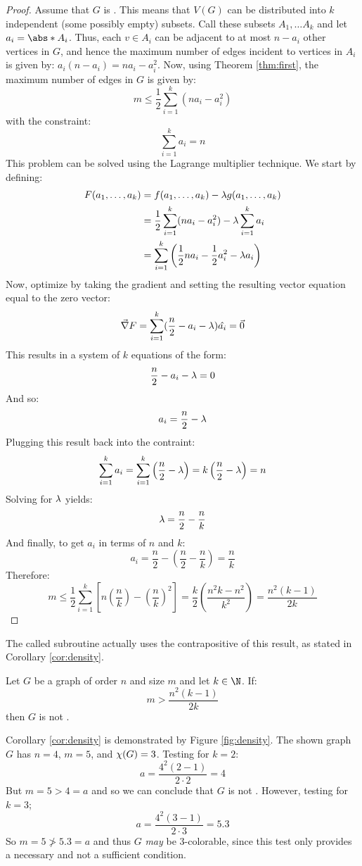 \begin{proof}
  Assume that \(G\) is .  This means that \(V(G)\) can be distributed into \(k\) independent (some
  possibly empty) subsets.  Call these subsets \(A_1,\ldots A_k\) and let \(a_i=\abs*{A_i}\).  Thus, each \(v\in
  A_i\) can be adjacent to at most \(n-a_i\) other vertices in \(G\), and hence the maximum number of edges
  incident to vertices in \(A_i\) is given by: \(a_i(n-a_i)=na_i-a_i^2\).  Now, using Theorem \ref{thm:first}, the
  maximum number of edges in \(G\) is given by:
  \[m\le\frac{1}{2}\sum_{i=1}^k(na_i-a_i^2)\]
  with the constraint:
  \[\sum_{i=1}^ka_i=n\]
  This problem can be solved using the Lagrange multiplier technique.  We start by defining:
  \begin{align*}
    F(a_1,\ldots,a_k) &= f(a_1,\ldots,a_k)-\lambda g(a_1,\ldots,a_k) \\
    &= \frac{1}{2}\sum_{i=1}^k(na_i-a_i^2)-\lambda\sum_{i=1}^ka_i \\
    &= \sum_{i=1}^k\left(\frac{1}{2}na_i-\frac{1}{2}a_i^2-\lambda a_i\right)
  \end{align*}
  Now, optimize by taking the gradient and setting the resulting vector equation equal to the zero vector:
  \[\vec{\nabla}F=\sum_{i=1}^k(\frac{n}{2}-a_i-\lambda)\hat{a_i}=\vec{0}\]
  This results in a system of \(k\) equations of the form:
  \[\frac{n}{2}-a_i-\lambda=0\]
  And so:
  \[a_i=\frac{n}{2}-\lambda\]
  Plugging this result back into the contraint:
  \[\sum_{i=1}^ka_i=\sum_{i=1}^k\left(\frac{n}{2}-\lambda\right)=k\left(\frac{n}{2}-\lambda\right)=n\]
  Solving for \(\lambda\) yields:
  \[\lambda=\frac{n}{2}-\frac{n}{k}\]
  And finally, to get \(a_i\) in terms of \(n\) and \(k\):
  \[a_i=\frac{n}{2}-\left(\frac{n}{2}-\frac{n}{k}\right)=\frac{n}{k}\]
  Therefore:
  \[m\le\frac{1}{2}\sum_{i=1}^k\left[n\left(\frac{n}{k}\right)-\left(\frac{n}{k}\right)^2\right]=
  \frac{k}{2}\left(\frac{n^2k-n^2}{k^2}\right)=\frac{n^2(k-1)}{2k}\]
\end{proof}

The called subroutine actually uses the contrapositive of this result, as stated in Corollary \ref{cor:density}.

\begin{corollary}
  \label{cor:density}
  Let \(G\) be a graph of order \(n\) and size \(m\) and let \(k\in\N\).  If:
  \[m>\frac{n^2(k-1)}{2k}\]
  then \(G\) is not .
\end{corollary}

Corollary \ref{cor:density} is demonstrated by Figure \ref{fig:density}.  The shown graph \(G\) has \(n=4\),
\(m=5\), and \(\chi(G)=3\).  Testing for \(k=2\):
\[a=\frac{4^2(2-1)}{2\cdot2}=4\]
But \(m=5>4=a\) and so we can conclude that \(G\) is not .  However, testing for \(k=3\);
\[a=\frac{4^2(3-1)}{2\cdot3}=5.3\]
So \(m=5\ngtr5.3=a\) and thus \(G\) \emph{may} be \(3\)-colorable, since this test only provides a necessary and
not a sufficient condition.

